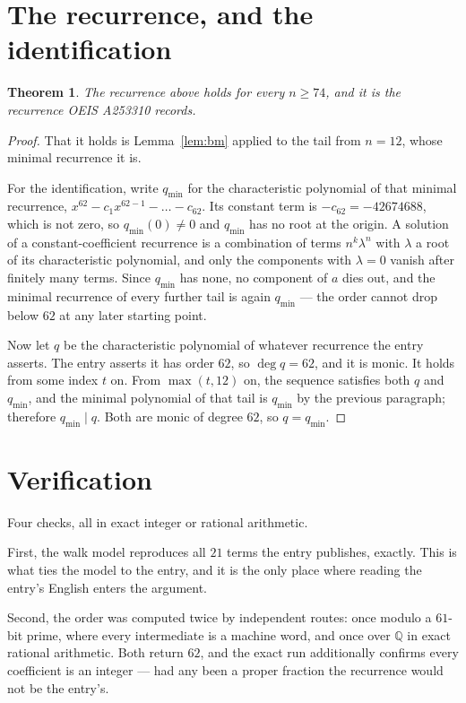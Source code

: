 \documentclass[11pt,a4paper]{article}
\theoremstyle{plain}
\newtheorem{theorem}{Theorem}
\theoremstyle{definition}
\begin{document}
\section{The recurrence, and the identification}

\begin{theorem}
The recurrence above holds for every $n\ge74$, and it is the recurrence OEIS A253310 records.
\end{theorem}

\begin{proof}
That it holds is Lemma~\ref{lem:bm} applied to the tail from $n=12$, whose minimal
recurrence it is.

For the identification, write $q_{\min}$ for the characteristic polynomial of that minimal
recurrence, $x^{62}-c_1x^{62-1}-\dots-c_{62}$. Its constant term is
$-c_{62}=-42674688$, which is not zero, so $q_{\min}(0)\neq0$ and $q_{\min}$ has no
root at the origin. A solution of a constant-coefficient recurrence is a combination of terms
$n^{k}\lambda^{n}$ with $\lambda$ a root of its characteristic polynomial, and only the
components with $\lambda=0$ vanish after finitely many terms. Since $q_{\min}$ has none, no
component of $a$ dies out, and the minimal recurrence of every further tail is again
$q_{\min}$ --- the order cannot drop below $62$ at any later starting point.

Now let $q$ be the characteristic polynomial of whatever recurrence the entry asserts. The
entry asserts it has order $62$, so $\deg q=62$, and it is monic. It holds from some
index $t$ on. From $\max(t,12)$ on, the sequence satisfies both $q$ and $q_{\min}$, and
the minimal polynomial of that tail is $q_{\min}$ by the previous paragraph; therefore
$q_{\min}\mid q$. Both are monic of degree $62$, so $q=q_{\min}$.
\end{proof}

\section{Verification}

Four checks, all in exact integer or rational arithmetic.

First, the walk model reproduces all $21$ terms the entry publishes, exactly. This is
what ties the model to the entry, and it is the only place where reading the entry's English
enters the argument.

Second, the order was computed twice by independent routes: once modulo a $61$-bit prime, where
every intermediate is a machine word, and once over $\mathbb{Q}$ in exact rational arithmetic.
Both return $62$, and the exact run additionally confirms every coefficient is an integer
--- had any been a proper fraction the recurrence would not be the entry's.
\end{document}
